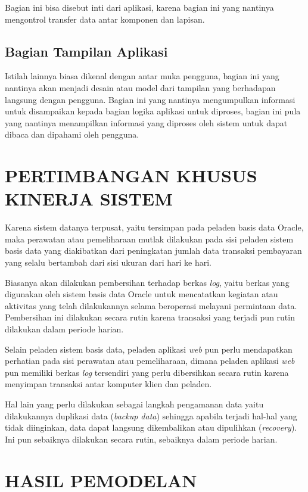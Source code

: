 \documentclass[pdftex,12pt, oneside]{article}
\begin{document}
Bagian ini bisa disebut inti dari aplikasi, karena bagian ini yang nantinya mengontrol transfer data antar komponen dan lapisan.

\subsection{Bagian Tampilan Aplikasi}

Istilah lainnya biasa dikenal dengan antar muka pengguna, bagian ini yang nantinya akan menjadi desain atau model dari tampilan yang berhadapan langsung dengan pengguna. Bagian ini yang nantinya mengumpulkan informasi untuk disampaikan kepada bagian logika aplikasi untuk diproses, bagian ini pula yang nantinya menampilkan informasi yang diproses oleh sistem untuk dapat dibaca dan dipahami oleh pengguna.

\section{PERTIMBANGAN KHUSUS KINERJA SISTEM}

Karena sistem datanya terpusat, yaitu tersimpan pada peladen basis data Oracle, maka perawatan atau pemeliharaan mutlak dilakukan pada sisi peladen sistem basis data yang diakibatkan dari peningkatan jumlah data transaksi pembayaran yang selalu bertambah dari sisi ukuran dari hari ke hari.

Biasanya akan dilakukan pembersihan terhadap berkas \textit{log}, yaitu berkas yang digunakan oleh sistem basis data Oracle untuk mencatatkan kegiatan atau aktivitas yang telah dilakukannya selama beroperasi melayani permintaan data. Pembersihan ini dilakukan secara rutin karena transaksi yang terjadi pun rutin dilakukan dalam periode harian.

Selain peladen sistem basis data, peladen aplikasi \textit{web} pun perlu mendapatkan perhatian pada sisi perawatan atau pemeliharaan, dimana peladen aplikasi \textit{web} pun memiliki berkas \textit{log} tersendiri yang perlu dibersihkan secara rutin karena menyimpan transaksi antar komputer klien dan peladen.

Hal lain yang perlu dilakukan sebagai langkah pengamanan data yaitu dilakukannya duplikasi data (\textit{backup data}) sehingga apabila terjadi hal-hal yang tidak diinginkan, data dapat langsung dikembalikan atau dipulihkan (\textit{recovery}). Ini pun sebaiknya dilakukan secara rutin, sebaiknya dalam periode harian.

\section{HASIL PEMODELAN}
\end{document}
